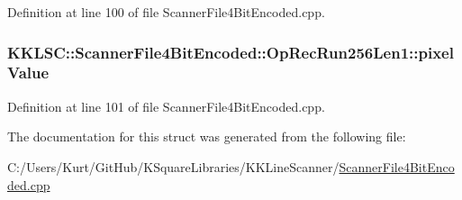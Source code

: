 Definition at line 100 of file Scanner\+File4\+Bit\+Encoded.\+cpp.

\subsubsection[{\texorpdfstring{pixel\+Value}{pixelValue}}]{ K\+K\+L\+S\+C\+::\+Scanner\+File4\+Bit\+Encoded\+::\+Op\+Rec\+Run256\+Len1\+::pixel\+Value}\hypertarget{struct_scanner_file4_bit_encoded_1_1_op_rec_run256_len1_adea99eee8f377b27753d33fe4fcd585c}{}\label{struct_scanner_file4_bit_encoded_1_1_op_rec_run256_len1_adea99eee8f377b27753d33fe4fcd585c}


Definition at line 101 of file Scanner\+File4\+Bit\+Encoded.\+cpp.



The documentation for this struct was generated from the following file\+:\begin{DoxyCompactItemize}
\item 
C\+:/\+Users/\+Kurt/\+Git\+Hub/\+K\+Square\+Libraries/\+K\+K\+Line\+Scanner/\hyperlink{_scanner_file4_bit_encoded_8cpp}{Scanner\+File4\+Bit\+Encoded.\+cpp}\end{DoxyCompactItemize}
